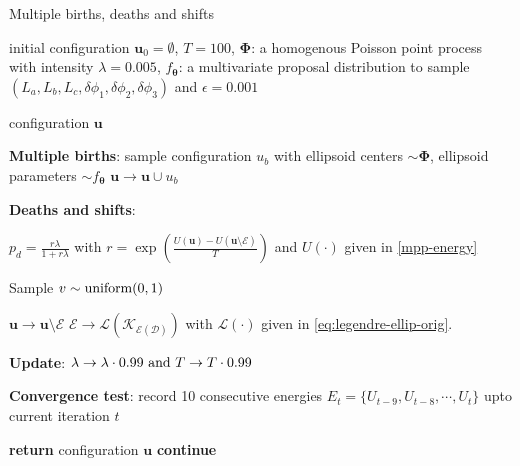 \documentclass[journal]{IEEEtran}
\begin{document}
\begin{algorithm}
  \caption{Multiple births, deaths and shifts}
  \label{algo-mbds}
  \begin{algorithmic}[1]

    \REQUIRE initial configuration $\mathbf{u}_0 = \emptyset$,
    $T = 100$, $\mathbf{\Phi}$: a homogenous Poisson point process
    with intensity $\lambda = 0.005$, $f_{\boldsymbol{\theta}}$: a
    multivariate proposal distribution to sample
    $ \left( L_a, L_b, L_c, \delta{\phi_1}, \delta{\phi_2},
      \delta{\phi_3} \right)$ and $\epsilon = 0.001$

    \ENSURE configuration $\mathbf{u}$

    \vspace{1mm} \REPEAT

    \vspace{1mm} \STATE \textbf{Multiple births}: sample configuration
    $u_b$ with ellipsoid centers $\sim \mathbf{\Phi}$, ellipsoid
    parameters $\sim f_{\boldsymbol{\theta}}$ \label{itr} \STATE
    $\mathbf{u} \rightarrow \mathbf{u} \cup u_b$

    \vspace{1mm} \STATE \textbf{Deaths and shifts}:

     \STATE
    $p_d = \frac{r\lambda}{1 + r\lambda}$ with
    $r = \exp \left( \frac{ U(\mathbf{u}) - U(\mathbf{u} \setminus
        \mathcal{E}) }{T} \right)$ and $U(\cdot)$ given in
    \eqref{mpp-energy}

    \STATE Sample $v \sim \textnormal{uniform}(0, 1)$

     \STATE
    $\mathbf{u} \rightarrow \mathbf{u} \setminus \mathcal{E}$ \ELSE
    \STATE
    $\mathcal{E} \rightarrow
    \mathcal{L(K_{\mathcal{E}(\mathcal{D})})}$ with
    $\mathcal{L}(\cdot)$ given in \eqref{eq:legendre-ellip-orig}.
    \ENDIF

    \ENDFOR

    \vspace{1mm} \STATE \textbf{Update}:
    $\lambda \rightarrow \lambda \cdot 0.99 \textnormal{ and } T
    \rightarrow T \cdot 0.99$

    \vspace{1mm} \STATE \textbf{Convergence test}: record 10
    consecutive energies
    $E_t = \{U_{t-9}, U_{t-8}, \cdots, U_{t}\}$ upto current iteration
    $t$

     \STATE \textbf{return} configuration $\mathbf{u}$
    \ELSE \STATE \textbf{continue}
    \ENDIF

  \end{algorithmic}
\end{algorithm}
\end{document}
